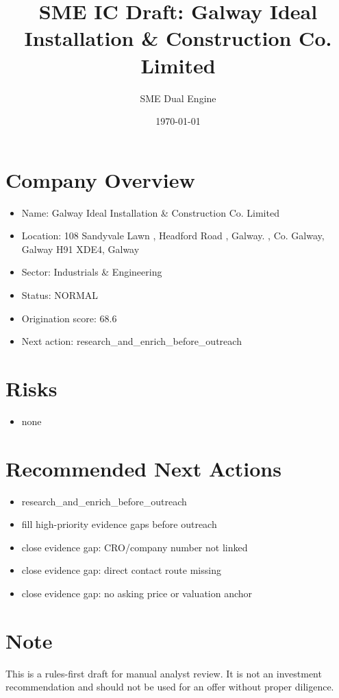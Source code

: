 \documentclass[11pt,a4paper]{article}
\title{SME IC Draft: Galway Ideal Installation \& Construction Co. Limited}
\author{SME Dual Engine}
\date{\today}
\begin{document}
\maketitle
\section*{Company Overview}
\begin{itemize}[leftmargin=1.4em]
\item Name: Galway Ideal Installation \& Construction Co. Limited
\item Location: 108 Sandyvale Lawn , Headford Road , Galway. , Co. Galway, Galway H91 XDE4, Galway
\item Sector: Industrials \& Engineering
\item Status: NORMAL
\item Origination score: 68.6
\item Next action: research\_and\_enrich\_before\_outreach
\end{itemize}
\section*{Risks}
\begin{itemize}[leftmargin=1.4em]
\item none
\end{itemize}
\section*{Recommended Next Actions}
\begin{itemize}[leftmargin=1.4em]
\item research\_and\_enrich\_before\_outreach
\item fill high-priority evidence gaps before outreach
\item close evidence gap: CRO/company number not linked
\item close evidence gap: direct contact route missing
\item close evidence gap: no asking price or valuation anchor
\end{itemize}
\section*{Note}
This is a rules-first draft for manual analyst review. It is not an investment
recommendation and should not be used for an offer without proper diligence.
\end{document}
